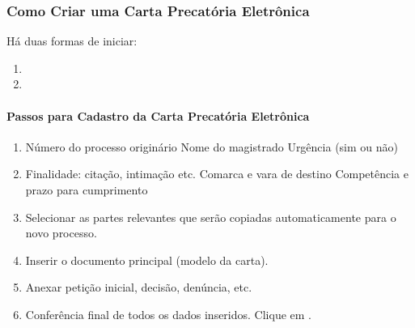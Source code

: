 \documentclass[letterpaper,10pt,brazil]{sphinxmanual}
\begin{document}
\subsubsection{Como Criar uma Carta Precatória Eletrônica}
\label{\detokenize{projud_44_cartaprecatoriaeletronica:como-criar-uma-carta-precatoria-eletronica}}
\sphinxAtStartPar
Há duas formas de iniciar:
\begin{enumerate}
%
\item {} 
\sphinxAtStartPar
{}
\sphinxhyphen{} 

\item {} 
\sphinxAtStartPar
{}
\sphinxhyphen{} 

\end{enumerate}


\paragraph{Passos para Cadastro da Carta Precatória Eletrônica}
\label{\detokenize{projud_44_cartaprecatoriaeletronica:passos-para-cadastro-da-carta-precatoria-eletronica}}\begin{enumerate}
%
\item {} 
\sphinxAtStartPar
{}
\sphinxhyphen{} Número do processo originário
\sphinxhyphen{} Nome do magistrado
\sphinxhyphen{} Urgência (sim ou não)

\item {} 
\sphinxAtStartPar
{}
\sphinxhyphen{} Finalidade: citação, intimação etc.
\sphinxhyphen{} Comarca e vara de destino
\sphinxhyphen{} Competência e prazo para cumprimento

\item {} 
\sphinxAtStartPar
{}
\sphinxhyphen{} Selecionar as partes relevantes que serão copiadas automaticamente para o novo processo.

\item {} 
\sphinxAtStartPar
{}
\sphinxhyphen{} Inserir o documento principal (modelo da carta).

\item {} 
\sphinxAtStartPar
{}
\sphinxhyphen{} Anexar petição inicial, decisão, denúncia, etc.

\item {} 
\sphinxAtStartPar
{}
\sphinxhyphen{} Conferência final de todos os dados inseridos.
\sphinxhyphen{} Clique em .

\end{enumerate}
\end{document}
